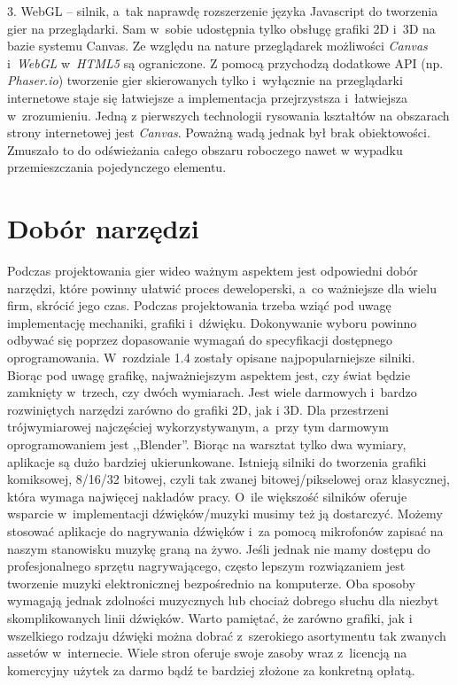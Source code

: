 \documentclass[brudnopis]{xmgr}
\begin{document}
3. WebGL -- silnik, a~tak naprawdę rozszerzenie języka Javascript do
tworzenia gier na przeglądarki. Sam w~sobie udostępnia tylko obsługę
grafiki 2D i~3D na bazie systemu Canvas. Ze względu na nature
przeglądarek możliwości {\em Canvas} i~{\em WebGL} w~{\em HTML5} są ograniczone. Z pomocą
przychodzą dodatkowe API (np. {\em Phaser.io}) tworzenie gier skierowanych
tylko i~wyłącznie na przeglądarki internetowe staje się łatwiejsze a
implementacja przejrzystsza i~łatwiejsza w~zrozumieniu.
Jedną z pierwszych technologii rysowania kształtów na obszarach strony internetowej jest {\em Canvas}. Poważną wadą jednak był brak obiektowości. Zmuszało to do odświeżania całego obszaru roboczego nawet w wypadku przemieszczania pojedynczego elementu.
\chapter{Dobór narzędzi}
Podczas projektowania gier wideo ważnym aspektem jest odpowiedni dobór
narzędzi, które powinny ułatwić proces deweloperski, a~co ważniejsze dla
wielu firm, skrócić jego czas. Podczas projektowania trzeba wziąć pod
uwagę implementację mechaniki, grafiki i~dźwięku. Dokonywanie wyboru
powinno odbywać się poprzez dopasowanie wymagań do specyfikacji
dostępnego oprogramowania. W~rozdziale 1.4 zostały opisane
najpopularniejsze silniki. Biorąc pod uwagę grafikę, najważniejszym
aspektem jest, czy świat będzie zamknięty w~trzech, czy dwóch wymiarach. Jest
wiele darmowych i~bardzo rozwiniętych narzędzi zarówno do grafiki 2D, jak
i 3D. Dla przestrzeni trójwymiarowej najczęściej wykorzystywanym, a~przy
tym darmowym oprogramowaniem jest ,,Blender''. Biorąc na warsztat tylko dwa
wymiary, aplikacje są dużo bardziej ukierunkowane. Istnieją silniki do
tworzenia grafiki komiksowej, 8/16/32 bitowej, czyli tak zwanej
bitowej/pikselowej oraz klasycznej, która wymaga najwięcej nakładów pracy. O~ile większość silników oferuje wsparcie w~implementacji
dźwięków/muzyki musimy też ją dostarczyć. Możemy stosować aplikacje do
nagrywania dźwięków i~za pomocą mikrofonów zapisać na naszym stanowisku
muzykę graną na żywo. Jeśli jednak nie mamy dostępu do profesjonalnego
sprzętu nagrywającego, często lepszym rozwiązaniem jest tworzenie muzyki
elektronicznej bezpośrednio na komputerze. Oba sposoby wymagają jednak
zdolności muzycznych lub chociaż dobrego słuchu dla niezbyt
skomplikowanych linii dźwięków. Warto pamiętać, że zarówno grafiki, jak i
wszelkiego rodzaju dźwięki można dobrać z~szerokiego asortymentu tak
zwanych assetów w~internecie. Wiele stron oferuje swoje zasoby wraz z~licencją na komercyjny użytek za darmo bądź te bardziej złożone za
konkretną opłatą.
\end{document}

